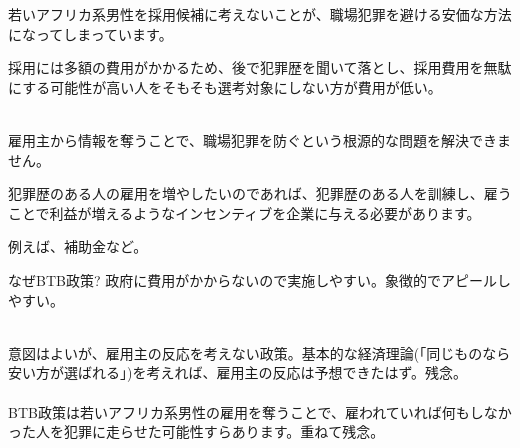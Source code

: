 \begin{frame}{}
若いアフリカ系男性を採用候補に考えないことが、職場犯罪を避ける安価な方法になってしまっています。
\begin{dinglist}{43}
\vspace{1.0ex}\setlength{\itemsep}{1.0ex}\setlength{\baselineskip}{12pt}
\item	採用には多額の費用がかかるため、後で犯罪歴を聞いて落とし、採用費用を無駄にする可能性が高い人をそもそも選考対象にしない方が費用が低い。\\~\\
\end{dinglist}

\pause
雇用主から情報を奪うことで、職場犯罪を防ぐという根源的な問題を解決できません。
\begin{dinglist}{43}
\vspace{1.0ex}\setlength{\itemsep}{1.0ex}\setlength{\baselineskip}{12pt}
\pause
\item	犯罪歴のある人の雇用を増やしたいのであれば、犯罪歴のある人を訓練し、雇うことで利益が増えるようなインセンティブを企業に与える必要があります。
\item	例えば、補助金など。
\pause
\item	なぜBTB政策? 政府に費用がかからないので実施しやすい。象徴的でアピールしやすい。\\~\\
\end{dinglist}

\pause
意図はよいが、雇用主の反応を考えない政策。基本的な経済理論(「同じものなら安い方が選ばれる」)を考えれば、雇用主の反応は予想できたはず。残念。\\~\\

\pause
BTB政策は若いアフリカ系男性の雇用を奪うことで、雇われていれば何もしなかった人を犯罪に走らせた可能性すらあります。重ねて残念。
\end{frame}

